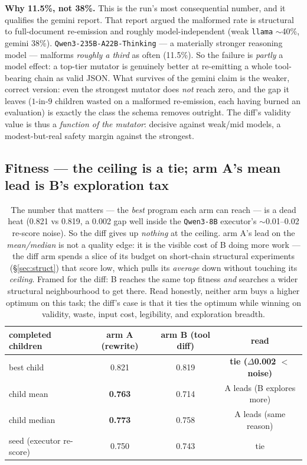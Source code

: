 \documentclass[11pt]{article}
\newcommand{\armA}{\textcolor{bad}{arm A}}
\newcommand{\armB}{\textcolor{accent}{arm B}}
\begin{document}
\noindent\textbf{Why 11.5\%, not 38\%.} This is the run's most consequential number, and it
qualifies the gemini report. That report argued the malformed rate is structural to
full-document re-emission and roughly model-independent (weak \texttt{llama} $\sim$40\%, gemini
38\%). \texttt{Qwen3-235B-A22B-Thinking} --- a materially stronger reasoning model --- malforms
\emph{roughly a third} as often (11.5\%). So the failure is \emph{partly} a model effect: a
top-tier mutator is genuinely better at re-emitting a whole tool-bearing chain as valid JSON.
What survives of the gemini claim is the weaker, correct version: even the strongest mutator
does \emph{not} reach zero, and the gap it leaves ($1$-in-$9$ children wasted on a malformed
re-emission, each having burned an evaluation) is exactly the class the schema removes outright.
The diff's validity value is thus a \emph{function of the mutator}: decisive against weak/mid
models, a modest-but-real safety margin against the strongest.

\subsection{Fitness --- the ceiling is a tie; \armA's mean lead is B's exploration tax}
\begin{table}[H]\centering
\begin{tabular}{lccc}
\toprule
completed children & \armA{} (rewrite) & \armB{} (tool diff) & read \\
\midrule
best child & 0.821 & 0.819 & \textbf{tie ($\Delta$0.002 $<$ noise)} \\
child mean & \textbf{0.763} & 0.714 & A leads (B explores more) \\
child median & \textbf{0.773} & 0.758 & A leads (same reason) \\
seed (executor re-score) & 0.750 & 0.743 & tie \\
\bottomrule
\end{tabular}
\caption{The number that matters --- the \emph{best} program each arm can reach --- is a dead heat
(0.821 vs 0.819, a 0.002 gap well inside the \texttt{Qwen3-8B} executor's $\sim$0.01--0.02 re-score
noise). So the diff gives up \emph{nothing} at the ceiling. \armA's lead on the \emph{mean/median}
is not a quality edge: it is the visible cost of B doing more work --- the diff arm spends a slice of
its budget on short-chain structural experiments (\S\ref{sec:struct}) that score low, which pulls its
\emph{average} down without touching its \emph{ceiling}. Framed for the diff: B reaches the same top
fitness \emph{and} searches a wider structural neighbourhood to get there. Read honestly, neither arm
buys a higher optimum on this task; the diff's case is that it ties the optimum while winning on
validity, waste, input cost, legibility, and exploration breadth.}
\end{table}
\end{document}
